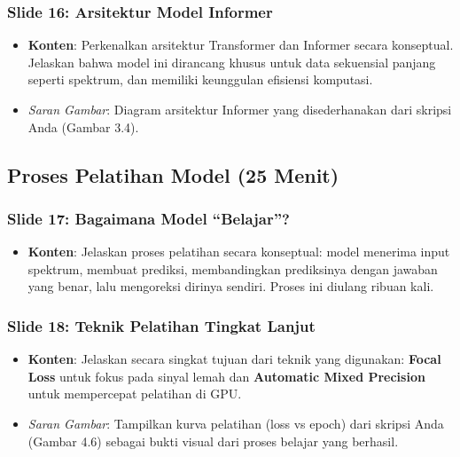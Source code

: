\documentclass[12pt, a4paper]{article}
\begin{document}
\subsubsection*{Slide 16: Arsitektur Model Informer}
\begin{itemize}
    \item \textbf{Konten}: Perkenalkan arsitektur Transformer dan Informer secara konseptual. Jelaskan bahwa model ini dirancang khusus untuk data sekuensial panjang seperti spektrum, dan memiliki keunggulan efisiensi komputasi.
    \item \textit{Saran Gambar}: Diagram arsitektur Informer yang disederhanakan dari skripsi Anda (Gambar 3.4).
\end{itemize}

\subsection{Proses Pelatihan Model (25 Menit)}

\subsubsection*{Slide 17: Bagaimana Model ``Belajar''?}
\begin{itemize}
    \item \textbf{Konten}: Jelaskan proses pelatihan secara konseptual: model menerima input spektrum, membuat prediksi, membandingkan prediksinya dengan jawaban yang benar, lalu mengoreksi dirinya sendiri. Proses ini diulang ribuan kali.
\end{itemize}

\subsubsection*{Slide 18: Teknik Pelatihan Tingkat Lanjut}
\begin{itemize}
    \item \textbf{Konten}: Jelaskan secara singkat tujuan dari teknik yang digunakan: \textbf{Focal Loss} untuk fokus pada sinyal lemah dan \textbf{Automatic Mixed Precision} untuk mempercepat pelatihan di GPU.
    \item \textit{Saran Gambar}: Tampilkan kurva pelatihan (loss vs epoch) dari skripsi Anda (Gambar 4.6) sebagai bukti visual dari proses belajar yang berhasil.
\end{itemize}

\end{document}
